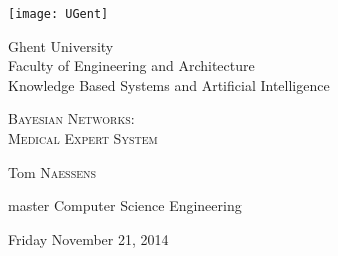 \begin{titlepage}

\fontsize{12pt}{14pt}
\selectfont

\begin{center}
\texttt{[image: UGent]}

\vspace{1.5cm}
Ghent University \\
Faculty of Engineering and Architecture \\
Knowledge Based Systems and Artificial Intelligence \\


\vspace{4.0cm}

\fontsize{17.28pt}{21pt}
\selectfont

\textsc{{\Large Bayesian Networks:} \\
{\large Medical Expert System}}

\fontsize{12pt}{14pt}
\selectfont

\vspace{.6cm}

{\Large 
	Tom \textsc{Naessens} \hfill \\
} 

\vspace{.6cm}

{ \large
	 master Computer Science Engineering
}

\vspace{0.4cm}

Friday November 21, 2014
\end{center}

\vspace{5.5cm}


\end{titlepage}

\thispagestyle{empty}
